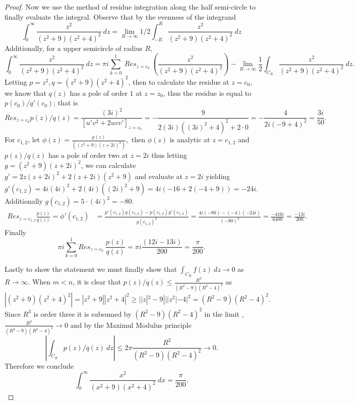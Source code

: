 \documentclass[11pt]{amsart}
\theoremstyle{definition}
\numberwithin{theorem}{section}
\numberwithin{definition}{section}
\numberwithin{equation}{section}
\newcommand{\parens}[1]{ \left( #1 \right) }
\begin{document}
\begin{proof}
	Now we use the method of residue integration along the half semi-circle to finally evaluate the integral. Observe
	that by the evenness of the integrand
	\begin{equation*}
		\int_0^\infty \frac{z^2}{(z^2 + 9)(z^2 + 4)^2}\ dz = \lim_{R\to\infty }1/2\int_{-R}^R \frac{z^2}{(z^2 + 9)(z^2 + 4)^2}\ dz
	\end{equation*}
	Additionally, for a upper semicircle of radius $R$, 
	\begin{equation*}
		 \int_0^\infty \frac{z^2}{(z^2 + 9)(z^2 + 4)^2}\ dz = \pi i \sum_{k=0}^{1}\ Res_{z= c_k}\ \parens{\frac{z^2}{(z^2 + 9)(z^2 + 4)^2}} - \lim_{R\to\infty } \frac{1}{2}\int_{C_R} \frac{z^2}{(z^2 + 9)(z^2 + 4)^2}\ dz.
	\end{equation*}
	Letting $p = z^2, q= (z^2 + 9)(z^2 + 4)^2$, then
	to calculate the residue at $z = c_0$, we know that $q(z)$ has a pole of order $1$ at $z = z_0$, thus
	the residue is equal to $p(c_0)/q'(c_0)$; that is
	\begin{equation*}
		Res_{z = c_0} p(z)/q(z) = \frac{(3i)^2}{[u'v^2 + 2uvv']_{z = c_0}} = -\frac{9}{2(3i)((3i)^2 + 4)^2 + 2\cdot 0} = -\frac{4}{2i(-9 + 4)^2} = \frac{3i}{50}.
	\end{equation*}
	For $c_{1,2}$, let $\phi(z) = \frac{p(z)}{((z^2 + 9)(z+2i)^2)},$ then $\phi(z)$ is analytic at $z = c_{1,2}$ and
	$p(z)/q(z)$ has a pole of order two at $z = 2i$ thus letting $g = (z^2 + 9)(z+2i)^2$, we can calculate $g' = 
	2z(z+2i)^2 + 2(z+2i)(z^2+9)$ and evaluate at $z = 2i$ yielding $g'(c_{1,2}) = 4i(4i)^2 + 2(4i)((2i)^2 + 9) = 4i(-16 + 2(-4 + 9)) = -24i.$ Additionally $g(c_{1,2}) = 5\cdot(4i)^2 = -80.$ 
	\begin{equation*}
	\begin{aligned}
		Res_{z = c_{1,2}} \frac{p(z) }{q(z)}= \phi'(c_{1,2}) &= \frac{p'(c_{1,2})g(c_{1,2}) - p(c_{1,2})g'(c_{1,2}) }{g(c_{1,2})^2}  = \frac{4i(-80) - (-4)(-24i)}{(-80)^2} = \frac{-416i}{6400} = \frac{-13i}{200}.
	\end{aligned}
	\end{equation*}
	Finally 
	\begin{equation*}
		\pi i \sum_{k=0}^1 Res_{z = c_k}\ \frac{p(z)}{q(z)} = \pi i \frac{(12i - 13i)}{200} = \frac{\pi}{200}.
	\end{equation*}

	Lastly to show the statement we must finally show that $\int_{C_R} f(z)\ dz \to 0$ as $R \to \infty.$
	When $m < n$, it is clear that $p(z)/q(z) \leq  \frac{R^{2}}{(R^{2}-9)(R^2 -4)^2}$ as $|(z^2 + 9)(z^2 + 4)^2| = |z^2 + 9||z^2 + 4|^2 \geq ||z|^{2} - 9|||z^2| - 4|^2 = (R^{2}-9)(R^2 -4)^2.$ Since $R^{3}$ is order three it is  subsumed by $(R^{2}-9)(R^2 -4)^2$ in the limit , $ \frac{R^{2}}{(R^{2}-9)(R^2 -4)^2} \to 0$
	and by the Maximul Modulus principle $$\left|\int_{C_R} p(z)/q(z)\ dz\right| \leq 2\pi  \frac{R^{2}}{(R^{2}-9)(R^2 -4)^2} \to 0.$$ Therefore we conclude
\begin{equation*}
	\int_0^\infty \frac{x^2}{(x^2 + 9)(x^2 + 4)^2}\ dx = \frac{\pi}{200}.
\end{equation*}
\end{proof}
\end{document}

